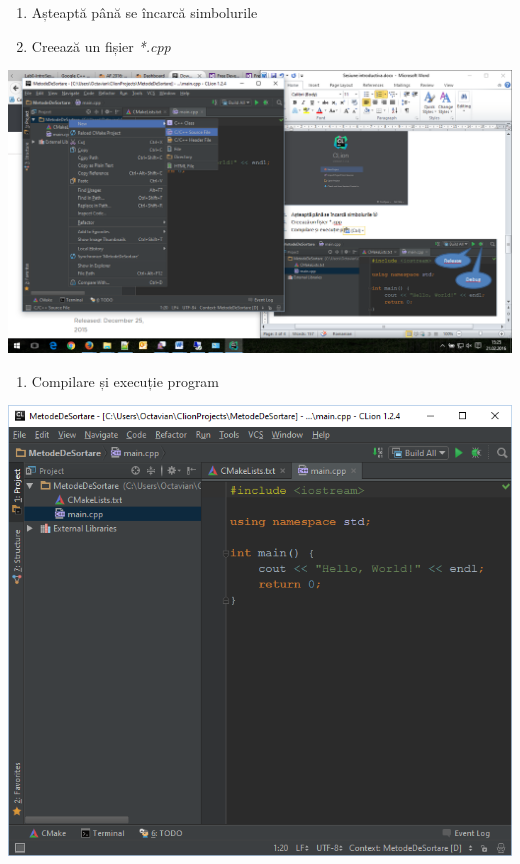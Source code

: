 \documentclass[../ro-fa-lab.tex]{subfiles}
\begin{document}
\begin{enumerate}
\def\labelenumi{\arabic{enumi}.}
\setcounter{enumi}{1}
\item
  Așteaptă până se încarcă simbolurile
\item
  Creează un fișier \emph{*.cpp}
\end{enumerate}

\includegraphics[width=\textwidth]{../Resources/lab0/image9.png}

\begin{enumerate}
\def\labelenumi{\arabic{enumi}.}
\setcounter{enumi}{3}
\item
  Compilare și execuție program
\end{enumerate}

\includegraphics[width=\textwidth]{../Resources/lab0/image10.png}
\end{document}
